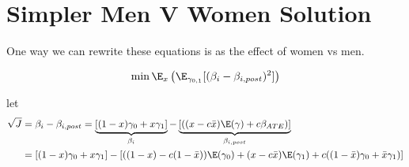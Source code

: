 










\section{Simpler Men V Women Solution}

One way we can rewrite these equations is as the effect of women vs men.

\begin{align*}
\min \E_x \left(\E_{\gamma_{0,1}}[(\beta_i - \beta_{i,post})^2]\right)
\end{align*}

let
\begin{align*}
	\sqrt{J} &= \beta_i -  \beta_{i,post} = \underbrace{[(1-x) \gamma_0 + x \gamma_1]}_{\text{$\beta_i$}}  - \underbrace{[((x - c \bar{x})\E(\gamma) + c \beta_{ATE})]}_\text{$\beta_{i,post}$} \\
	  &= [(1-x) \gamma_0 + x \gamma_1]  - [((1-x) - c (1 - \bar{x})) \E(\gamma_0) + (x - c \bar{x})\E(\gamma_1) + c((1-\bar{x}) \gamma_0 + \bar{x} \gamma_1)] \\
\end{align*}

